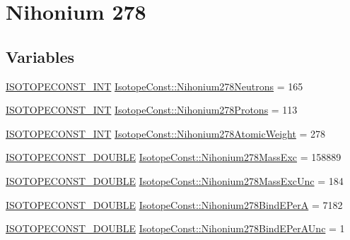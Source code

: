 \hypertarget{group___isotope_const-_nihonium-_nh278}{}\section{Nihonium 278}
\label{group___isotope_const-_nihonium-_nh278}
\subsection*{Variables}
\begin{DoxyCompactItemize}
\item 
\mbox{\hyperlink{group___isotope_const-_macros_ga5f18360b3e99483a35c32d789e62621c}{I\+S\+O\+T\+O\+P\+E\+C\+O\+N\+S\+T\+\_\+\+I\+NT}} \mbox{\hyperlink{group___isotope_const-_nihonium-_nh278_ga0fb33a52477123bb47352d2570fa5dc4}{Isotope\+Const\+::\+Nihonium278\+Neutrons}} = 165
\item 
\mbox{\hyperlink{group___isotope_const-_macros_ga5f18360b3e99483a35c32d789e62621c}{I\+S\+O\+T\+O\+P\+E\+C\+O\+N\+S\+T\+\_\+\+I\+NT}} \mbox{\hyperlink{group___isotope_const-_nihonium-_nh278_gab1b563df9b1e0a0a156e46fe78566810}{Isotope\+Const\+::\+Nihonium278\+Protons}} = 113
\item 
\mbox{\hyperlink{group___isotope_const-_macros_ga5f18360b3e99483a35c32d789e62621c}{I\+S\+O\+T\+O\+P\+E\+C\+O\+N\+S\+T\+\_\+\+I\+NT}} \mbox{\hyperlink{group___isotope_const-_nihonium-_nh278_ga8267cafc98345558b3a45f6abf4a8573}{Isotope\+Const\+::\+Nihonium278\+Atomic\+Weight}} = 278
\item 
\mbox{\hyperlink{group___isotope_const-_macros_ga8f45a7272ce02c0b4c65c44636ed719a}{I\+S\+O\+T\+O\+P\+E\+C\+O\+N\+S\+T\+\_\+\+D\+O\+U\+B\+LE}} \mbox{\hyperlink{group___isotope_const-_nihonium-_nh278_gae0210e6270cc48bc9deb4ff2d90a33a4}{Isotope\+Const\+::\+Nihonium278\+Mass\+Exc}} = 158889
\item 
\mbox{\hyperlink{group___isotope_const-_macros_ga8f45a7272ce02c0b4c65c44636ed719a}{I\+S\+O\+T\+O\+P\+E\+C\+O\+N\+S\+T\+\_\+\+D\+O\+U\+B\+LE}} \mbox{\hyperlink{group___isotope_const-_nihonium-_nh278_ga10d2cea54d2dd787f96848956d5018dd}{Isotope\+Const\+::\+Nihonium278\+Mass\+Exc\+Unc}} = 184
\item 
\mbox{\hyperlink{group___isotope_const-_macros_ga8f45a7272ce02c0b4c65c44636ed719a}{I\+S\+O\+T\+O\+P\+E\+C\+O\+N\+S\+T\+\_\+\+D\+O\+U\+B\+LE}} \mbox{\hyperlink{group___isotope_const-_nihonium-_nh278_ga54820e89b928401870bfed00b2cc3992}{Isotope\+Const\+::\+Nihonium278\+Bind\+E\+PerA}} = 7182
\item 
\mbox{\hyperlink{group___isotope_const-_macros_ga8f45a7272ce02c0b4c65c44636ed719a}{I\+S\+O\+T\+O\+P\+E\+C\+O\+N\+S\+T\+\_\+\+D\+O\+U\+B\+LE}} \mbox{\hyperlink{group___isotope_const-_nihonium-_nh278_gaf646a8543aa5dbf25e0b93d8377730c5}{Isotope\+Const\+::\+Nihonium278\+Bind\+E\+Per\+A\+Unc}} = 1

\end{DoxyCompactItemize}
